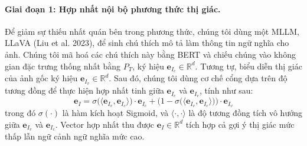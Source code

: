 \documentclass[10pt,twocolumn,a4paper]{article}
\begin{document}
\paragraph{Giai đoạn 1: Hợp nhất nội bộ phương thức thị giác.}
Để giảm sự thiếu nhất quán bên trong phương thức, chúng tôi dùng một MLLM, LLaVA (Liu et al. 2023), để sinh chú thích mô tả làm thông tin ngữ nghĩa cho ảnh. Chúng tôi mã hoá các chú thích này bằng BERT và chiếu chúng vào không gian đặc trưng thống nhất bằng $P_T$, ký hiệu $\mathbf{e}_{I_c} \in \mathbb{R}^d$. Tương tự, biểu diễn thị giác của ảnh gốc ký hiệu $\mathbf{e}_{I_v} \in \mathbb{R}^d$. Sau đó, chúng tôi dùng cơ chế cổng dựa trên độ tương đồng để thực hiện hợp nhất tinh giữa $\mathbf{e}_{I_c}$ và $\mathbf{e}_{I_v}$, tính như sau:
\begin{equation}
\mathbf{e}_I = \sigma\big(\langle \mathbf{e}_{I_v}, \mathbf{e}_{I_c}\rangle\big)\cdot \mathbf{e}_{I_c} + \Big(1 - \sigma\big(\langle \mathbf{e}_{I_v}, \mathbf{e}_{I_c}\rangle\big)\Big)\cdot \mathbf{e}_{I_v}
\label{eq:1}
\end{equation}
trong đó $\sigma(\cdot)$ là hàm kích hoạt Sigmoid, và $\langle\cdot,\cdot\rangle$ là độ tương đồng tích vô hướng giữa $\mathbf{e}_{I_v}$ và $\mathbf{e}_{I_c}$. Vector hợp nhất thu được $\mathbf{e}_I \in \mathbb{R}^d$ tích hợp cả gợi ý thị giác mức thấp lẫn ngữ cảnh ngữ nghĩa mức cao.
\end{document}
